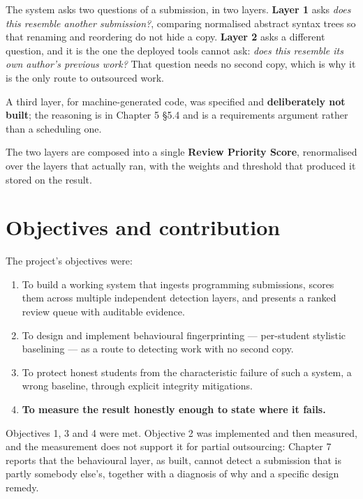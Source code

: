 The system asks two questions of a submission, in two layers.
\textbf{Layer 1} asks \emph{does this resemble another submission?},
comparing normalised abstract syntax trees so that renaming and
reordering do not hide a copy. \textbf{Layer 2} asks a different
question, and it is the one the deployed tools cannot ask: \emph{does
this resemble its own author's previous work?} That question needs no
second copy, which is why it is the only route to outsourced work.

A third layer, for machine-generated code, was specified and
\textbf{deliberately not built}; the reasoning is in Chapter 5 \S{}5.4 and
is a requirements argument rather than a scheduling one.

The two layers are composed into a single \textbf{Review Priority
Score}, renormalised over the layers that actually ran, with the weights
and threshold that produced it stored on the result.

\hypertarget{objectives-and-contribution}{%
\section{Objectives and
contribution}\label{objectives-and-contribution}}

The project's objectives were:

\begin{enumerate}
\def\labelenumi{\arabic{enumi}.}
\tightlist
\item
  To build a working system that ingests programming submissions, scores
  them across multiple independent detection layers, and presents a
  ranked review queue with auditable evidence.
\item
  To design and implement behavioural fingerprinting --- per-student
  stylistic baselining --- as a route to detecting work with no second
  copy.
\item
  To protect honest students from the characteristic failure of such a
  system, a wrong baseline, through explicit integrity mitigations.
\item
  \textbf{To measure the result honestly enough to state where it
  fails.}
\end{enumerate}

Objectives 1, 3 and 4 were met. Objective 2 was implemented and then
measured, and the measurement does not support it for partial
outsourcing: Chapter 7 reports that the behavioural layer, as built,
cannot detect a submission that is partly somebody else's, together with
a diagnosis of why and a specific design remedy.

